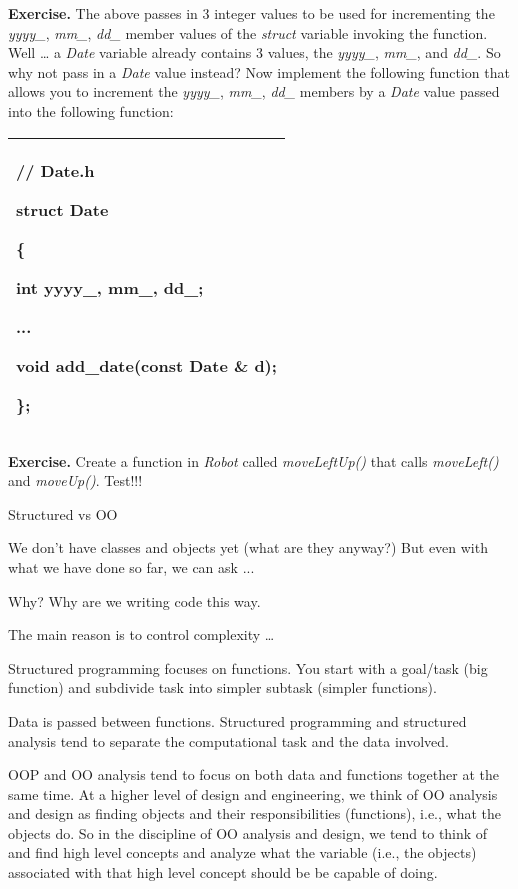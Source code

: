 \documentclass[
]{article}
\begin{document}
\textbf{Exercise.} The above passes in 3 integer values to be used for
incrementing the \emph{yyyy\_}, \emph{mm\_}, \emph{dd\_} member values
of the \emph{struct} variable invoking the function. Well \ldots{} a
\emph{Date} variable already contains 3 values, the \emph{yyyy\_},
\emph{mm\_}, and \emph{dd\_}. So why not pass in a \emph{Date} value
instead? Now implement the following function that allows you to
increment the \emph{yyyy\_}, \emph{mm\_}, \emph{dd\_} members by a
\emph{Date} value passed into the following function:

\begin{longtable}[]{@{}l@{}}
\toprule
\endhead
\begin{minipage}[t]{0.97\columnwidth}\raggedright
// Date.h

struct Date

\{

int yyyy\_, mm\_, dd\_;

...

void add\_date(const Date \& d);

\};\strut
\end{minipage}\tabularnewline
\bottomrule
\end{longtable}

\textbf{Exercise.} Create a function in \emph{Robot} called
\emph{moveLeftUp()} that calls \emph{moveLeft()} and \emph{moveUp()}.
Test!!!

Structured vs OO

We don't have classes and objects yet (what are they anyway?) But even
with what we have done so far, we can ask ...

Why? Why are we writing code this way.

The main reason is to control complexity \ldots{}

Structured programming focuses on functions. You start with a goal/task
(big function) and subdivide task into simpler subtask (simpler
functions).

Data is passed between functions. Structured programming and structured
analysis tend to separate the computational task and the data involved.

OOP and OO analysis tend to focus on both data and functions together at
the same time. At a higher level of design and engineering, we think of
OO analysis and design as finding objects and their responsibilities
(functions), i.e., what the objects do. So in the discipline of OO
analysis and design, we tend to think of and find high level concepts
and analyze what the variable (i.e., the objects) associated with that
high level concept should be be capable of doing.
\end{document}
